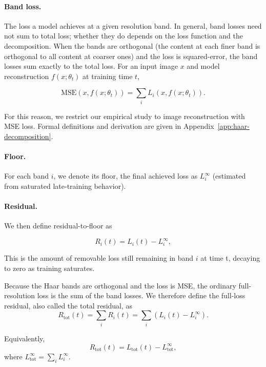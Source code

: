 \documentclass{article}
\begin{document}
\paragraph{Band loss.} The loss a model achieves at a given resolution band. In
general, band losses need not sum to total loss; whether they do depends
on the loss function and the decomposition. When the bands are
orthogonal (the content at each finer band is orthogonal to all content
at coarser ones) and the loss is squared-error, the band losses sum
exactly to the total loss. For an input image $x$ and model reconstruction
$f(x;\theta_t)$ at training time $t$,

\begin{equation}\label{eq:additivity}
\mathrm{MSE}(x, f(x;\theta_t)) = \sum_i L_i(x, f(x;\theta_t)).
\end{equation}

For this reason, we restrict our empirical study to image reconstruction
with MSE loss. Formal definitions and derivation are given in Appendix~\ref{app:haar-decomposition}.

\paragraph{Floor.} For each band $i$, we denote its floor, the final achieved loss as $L_i^\infty$ 
(estimated from saturated late-training behavior).

\paragraph{Residual.} We then define residual-to-floor as

\begin{equation}\label{eq:residual}
R_i(t) = L_i(t) - L_i^\infty,
\end{equation}

This is the amount of removable loss still remaining in band $i$ at time
t, decaying to zero as training saturates.

Because the Haar bands are orthogonal and the loss is MSE, the
ordinary full-resolution loss is the sum of the band losses. We therefore
define the full-loss residual, also called the total residual, as
\[
R_{\mathrm{tot}}(t)
=
\sum_i R_i(t)
=
\sum_i \left(L_i(t)-L_i^\infty\right).
\]

Equivalently,
\[
R_{\mathrm{tot}}(t) = L_{\mathrm{tot}}(t) - L_{\mathrm{tot}}^\infty,
\]
where $L_{\mathrm{tot}}^\infty = \sum_i L_i^\infty$.
\end{document}
